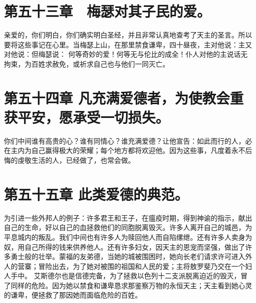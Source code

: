 
\section{第五十三章　梅瑟对其子民的爱。}

亲爱的，你们明白，你们确实明白圣经，并且非常认真地查考了天主的圣言。所以要将这些事记在心里。当梅瑟上山，在那里禁食谦卑，四十昼夜，主对他说：主又对他说：但梅瑟说： 何等奇妙的爱！何等无与伦比的成全！仆人对他的主说话无拘束，为百姓求赦免，或祈求自己也与他们一同灭亡。\par


\section{第五十四章 凡充满爱德者，为使教会重获平安，愿承受一切损失。}

你们中间谁有高贵的心？谁有同情心？谁充满爱德？让他宣告：如此而行的人，必在主内为自己赢得极大的荣耀；每个地方都将欢迎他。因为这些事，凡度着永不后悔的虔敬生活的人，已经做了，也常会做。\par


\section{第五十五章 此类爱德的典范。}

为引进一些外邦人的例子：许多君王和王子，在瘟疫时期，得到神谕的指示，献出自己的生命，好以自己的血拯救他们的同胞脱离毁灭。许多人离开自己的城邑，为平息城内的叛乱。我们中间也有许多人为赎回他人而自陷缧绁。还有许多人卖身为奴，用自己所得的钱来供养他人。还有许多妇女，因天主的恩宠而坚强，做出了许多勇士般的壮举。蒙福的友弟德，当她的城被围困时，她向长老们请求许可进入外人的营寨；冒险出去，为了她对被围的祖国和人民的爱；主将敖罗斐乃交在一个妇人手中。 艾斯德尔也是信德完备，为了拯救以色列十二支派脱离迫近的毁灭，冒了同样的危险。因为她以禁食和谦卑恳求那鉴察万物的永恒天主；天主看到她心灵的谦卑，便拯救了那因她而面临危险的百姓。\par

